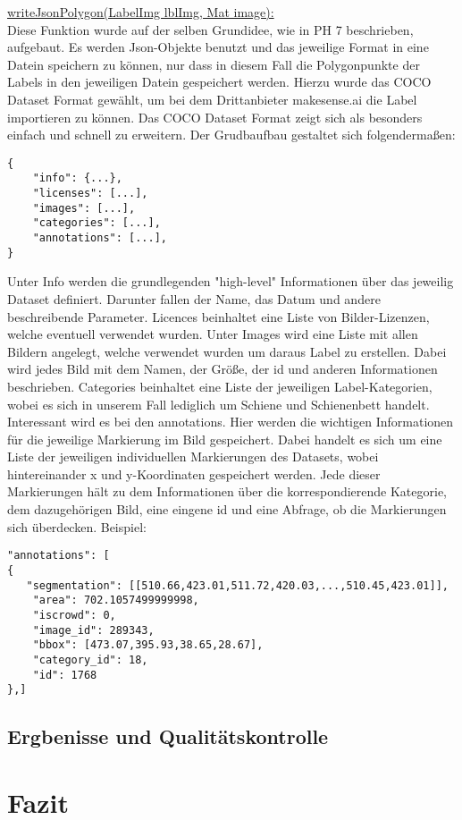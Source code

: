 \documentclass[11pt]{scrartcl}
\begin{document}
\noindent
\underline{writeJsonPolygon(LabelImg lblImg, Mat image):}
\\

\noindent
Diese Funktion wurde auf der selben Grundidee, wie in PH 7 beschrieben, aufgebaut. Es werden Json-Objekte benutzt und das jeweilige Format in eine Datein speichern zu können, nur dass in diesem Fall die Polygonpunkte der Labels in den jeweiligen Datein gespeichert werden. Hierzu wurde das COCO Dataset Format gewählt, um bei dem Drittanbieter makesense.ai die Label importieren zu können. Das COCO Dataset Format zeigt sich als besonders einfach und schnell zu erweitern. Der Grudbaufbau gestaltet sich folgendermaßen:
\begin{lstlisting}  
{
    "info": {...},
    "licenses": [...],
    "images": [...],
    "categories": [...], 
    "annotations": [...],
}
\end{lstlisting}
Unter Info werden die grundlegenden "high-level" Informationen über das jeweilig Dataset definiert. Darunter fallen der Name, das Datum und andere beschreibende Parameter. Licences beinhaltet eine Liste von Bilder-Lizenzen, welche eventuell verwendet wurden. Unter Images wird eine Liste mit allen Bildern angelegt, welche verwendet wurden um daraus Label zu erstellen. Dabei wird jedes Bild mit dem Namen, der Größe, der id und anderen Informationen beschrieben. Categories beinhaltet eine Liste der jeweiligen Label-Kategorien, wobei es sich in unserem Fall lediglich um Schiene und Schienenbett handelt. Interessant wird es bei den annotations. Hier werden die wichtigen Informationen für die jeweilige Markierung im Bild gespeichert. Dabei handelt es sich um eine Liste der jeweiligen individuellen Markierungen des Datasets, wobei hintereinander x und y-Koordinaten gespeichert werden. Jede dieser Markierungen hält zu dem Informationen über die korrespondierende Kategorie, dem dazugehörigen Bild, eine eingene id und eine Abfrage, ob die Markierungen sich überdecken. Beispiel:
\begin{lstlisting}  
"annotations": [
{
   "segmentation": [[510.66,423.01,511.72,420.03,...,510.45,423.01]],
    "area": 702.1057499999998,
    "iscrowd": 0,
    "image_id": 289343,
    "bbox": [473.07,395.93,38.65,28.67],
    "category_id": 18,
    "id": 1768
},]
\end{lstlisting}

\noindent



\subsection{Ergbenisse und Qualitätskontrolle}
\label{sec:Ergebnisse und Qualitätskontrolle}
\section{Fazit}
\label{sec:Fazit}
\end{document}
